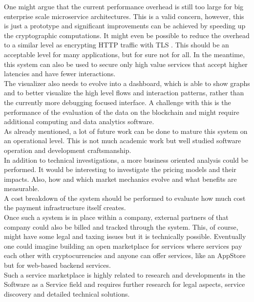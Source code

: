 \documentclass[a4paper,12pt]{scrartcl}
\begin{document}
One might argue that the current performance overhead is still too large for big enterprise scale microservice architectures. This is a valid concern, however, this is just a prototype and significant improvements can be achieved by speeding up the cryptographic computations. It might even be possible to reduce the overhead to a similar level as encrypting HTTP traffic with TLS \cite{dierks1999rfc}. This should be an acceptable level for many applications, but for sure not for all. In the meantime, this system can also be used to secure only high value services that accept higher latencies and have fewer interactions.\\

The visualizer also needs to evolve into a dashboard, which is able to show graphs and to better visualize the high level flows and interaction patterns, rather than the currently more debugging focused interface. A challenge with this is the performance of the evaluation of the data on the blockchain and might require additional computing and data analytics software.\\

As already mentioned, a lot of future work can be done to mature this system on an operational level. This is not much academic work but well studied software operation and development craftsmanship.\\

In addition to technical investigations, a more business oriented analysis could be performed. It would be interesting to investigate the pricing models and their impacts. Also, how and which market mechanics evolve and what benefits are measurable.\\
A cost breakdown of the system should be performed to evaluate how much cost the payment infrastructure itself creates.\\

Once such a system is in place within a company, external partners of that company could also be billed and tracked through the system. This, of course, might have some legal and taxing issues but it is technically possible. Eventually one could imagine building an open marketplace for services where services pay each other with cryptocurrencies and anyone can offer services, like an AppStore but for web-based backend services.\\
Such a service marketplace is highly related to research and developments in the Software as a Service field and requires further research for legal aspects, service discovery and detailed technical solutions.

\newpage

{}

\end{document}
